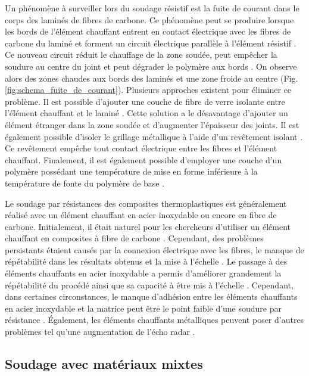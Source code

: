 Un phénomène à surveiller lors du soudage résistif est la fuite de courant dans le corps des laminés de fibres de carbone. 
Ce phénomène peut se produire lorsque les bords de l'élément chauffant entrent en contact électrique avec les fibres de carbone du laminé et forment un circuit électrique parallèle à l'élément résistif \cite{Hou1999a,Ageorges2000}. 
Ce nouveau circuit réduit le chauffage de la zone soudée, peut empêcher la soudure au centre du joint et peut dégrader le polymère aux bords \cite{Dube2008}. 
On observe alors des zones chaudes aux bords des laminés et une zone froide au centre (Fig. \ref{fig:schema_fuite_de_courant}). 
Plusieurs approches existent pour éliminer ce problème. 
Il est possible d'ajouter une couche de fibre de verre isolante entre l'élément chauffant et le laminé \cite{Hou1999a}. 
Cette solution a le désavantage d'ajouter un élément étranger dans la zone soudée et d'augmenter l'épaisseur des joints. 
Il est également possible d'isoler le grillage métallique à l'aide d'un revêtement isolant \cite{Dube2008,Dube2009a}. 
Ce revêtement empêche tout contact électrique entre les fibres et l'élément chauffant. 
Finalement, il est également possible d'employer une couche d'un polymère possédant une température de mise en forme inférieure à la température de fonte du polymère de base \cite{Stavrov2005a}. 

Le soudage par résistances des composites thermoplastiques est généralement réalisé avec un élément chauffant en acier inoxydable ou encore en fibre de carbone. 
Initialement, il était naturel pour les chercheurs d'utiliser un élément chauffant en composites à fibre de carbone \cite{Ageorges2000a,houghton1984bonding,Eveno1988}. 
Cependant, des problèmes persistants étaient causés par la connexion électrique avec les fibres, le manque de répétabilité dans les résultats obtenus et la mise à l'échelle \cite{McKnight1997}. 
Le passage à des éléments chauffants en acier inoxydable a permis d'améliorer grandement la répétabilité du procédé ainsi que sa capacité à être mis à l'échelle \cite{Hou1999a}.  
Cependant, dans certaines circonstances, le manque d'adhésion entre les éléments chauffants en acier inoxydable et la matrice peut être le point faible d'une soudure par résistance \cite{Dube2007,Dube2012a,Dube2009a,Shi2014,Shi2015a}. 
Également, les éléments chauffants métalliques peuvent poser d'autres problèmes tel qu'une augmentation de l'écho radar \cite{Ageorges2001a}. 

\FloatBarrier
\subsection{Soudage avec matériaux mixtes}


